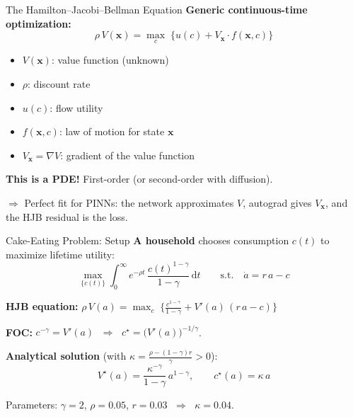 \documentclass[aspectratio=169,11pt]{beamer}
\newcommand{\emphc}[1]{\textcolor{harvardcrimson}{#1}}
\newcommand{\x}{\bm{x}}
\begin{document}
\begin{frame}{The Hamilton--Jacobi--Bellman Equation}
\textbf{Generic continuous-time optimization:}
\[
\rho\, V(\x) = \max_{c}\;\bigl\{u(c) + V_{\x}\cdot f(\x, c)\bigr\}
\]

\vspace{0.3em}
\begin{itemize}
    \item $V(\x)$: \emphc{value function} (unknown)
    \item $\rho$: discount rate
    \item $u(c)$: flow utility
    \item $f(\x,c)$: law of motion for state $\x$
    \item $V_{\x} = \nabla V$: gradient of the value function
\end{itemize}

\vspace{0.4em}
\textbf{This is a PDE!} First-order (or second-order with diffusion).

\vspace{0.3em}
$\Rightarrow$ \emphc{Perfect fit for PINNs:} the network approximates $V$, autograd gives $V_{\x}$, and the HJB residual is the loss.
\end{frame}

\begin{frame}{Cake-Eating Problem: Setup}
\textbf{A household} chooses consumption $c(t)$ to maximize lifetime utility:
\[
\max_{\{c(t)\}} \int_0^\infty e^{-\rho t}\,\frac{c(t)^{1-\gamma}}{1-\gamma}\,\mathrm{d}t
\qquad\text{s.t.}\quad \dot{a} = r\,a - c
\]

\textbf{HJB equation:}\quad
$\rho\,V(a) = \max_c\;\bigl\{\frac{c^{1-\gamma}}{1-\gamma} + V'(a)\,(r\,a - c)\bigr\}$

\vspace{0.2em}
\textbf{FOC:} $c^{-\gamma} = V'(a)$ $\;\Rightarrow\;$ $c^\star = \bigl(V'(a)\bigr)^{-1/\gamma}$.

\vspace{0.2em}
\textbf{Analytical solution} (with $\kappa = \frac{\rho - (1-\gamma)r}{\gamma} > 0$):
\[
V^\star(a) = \frac{\kappa^{-\gamma}}{1-\gamma}\,a^{1-\gamma}, \qquad c^\star(a) = \kappa\,a
\]

{\small Parameters: $\gamma = 2$, $\rho = 0.05$, $r = 0.03$ $\;\Rightarrow\;$ $\kappa = 0.04$.}
\end{frame}
\end{document}
